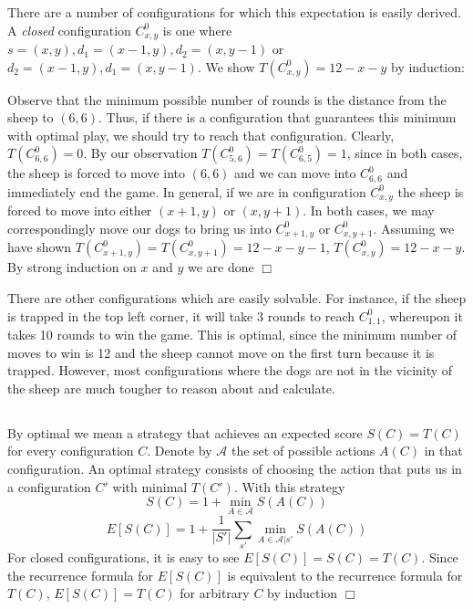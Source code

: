 \documentclass{article}
\newenvironment{myindentpar}[1]
  {\begin{list}{}
          {\setlength{\leftmargin}{#1}
          \setlength{\rightmargin}{#1}}
          \item[]
  }
  {\end{list}}
\begin{document}
There are a number of configurations for which this expectation is easily derived. A \textit{closed} configuration $C_{x,y}^0$ is one where $s = (x,y), d_1 = (x-1,y), d_2 = (x,y-1)$ or $d_2 = (x-1,y), d_1 = (x,y-1)$. We show $T(C_{x,y}^0) = 12-x-y$ by induction:
\begin{myindentpar}{1em}
Observe that the minimum possible number of rounds is the distance from the sheep to $(6,6)$. Thus, if there is a configuration that guarantees this minimum with optimal play, we should try to reach that configuration. Clearly, $T(C_{6,6}^0) = 0$. By our observation $T(C_{5,6}^0) = T(C_{6,5}^0) = 1$, since in both cases, the sheep is forced to move into $(6,6)$ and we can move into $C_{6,6}^0$ and immediately end the game. In general, if we are in configuration $C_{x,y}^0$ the sheep is forced to move into either $(x+1,y)$ or $(x,y+1)$. In both cases, we may correspondingly move our dogs to bring us into $C_{x+1,y}^0$ or $C_{x,y+1}^0$. Assuming we have shown $T(C_{x+1,y}^0) = T(C_{x,y+1}^0) = 12-x-y-1$, $T(C_{x,y}^0) = 12-x-y$. By strong induction on $x$ and $y$ we are done $\Box$
\end{myindentpar}
There are other configurations which are easily solvable. For instance, if the sheep is trapped in the top left corner, it will take 3 rounds to reach $C_{1,1}^0$, whereupon it takes 10 rounds to win the game. This is optimal, since the minimum number of moves to win is 12 and the sheep cannot move on the first turn because it is trapped. However, most configurations where the dogs are not in the vicinity of the sheep are much tougher to reason about and calculate.

\subsection{}
By optimal we mean a strategy that achieves an expected score $S(C) = T(C)$ for every configuration $C$. Denote by $\mathcal{A}$ the set of possible actions $A(C)$ in that configuration. An optimal strategy consists of choosing the action that puts us in a configuration $C'$ with minimal $T(C')$. With this strategy
$$S(C) = 1 + \min\limits_{A\in\mathcal{A}} S(A(C))$$
$$E[S(C)] = 1 + \frac{1}{|S'|} \sum_{s'} \min\limits_{A\in\mathcal{A}|s'} S(A(C))$$
For closed configurations, it is easy to see $E[S(C)] = S(C) = T(C)$. Since the recurrence formula for $E[S(C)]$ is equivalent to the recurrence formula for $T(C)$, $E[S(C)] = T(C)$ for arbitrary $C$ by induction $\Box$
\end{document}

